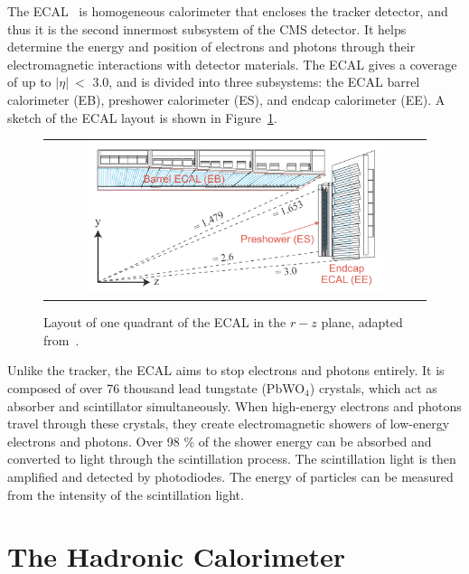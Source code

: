 The \ac{ECAL}~\cite{CMS:1997ysd} is homogeneous calorimeter that encloses the tracker detector, and thus it is the second innermost subsystem of the \ac{CMS} detector. It helps determine the energy and position of electrons and photons through their electromagnetic interactions with detector materials. The \ac{ECAL} gives a coverage of up to $|\eta|~<$ 3.0, and is divided into three subsystems: the \ac{ECAL} barrel calorimeter (EB), preshower calorimeter (ES), and endcap calorimeter (EE). A sketch of the \ac{ECAL} layout is shown in Figure~\ref{fig:ECAL}.

\begin{figure}[tbh!]
 \begin{center}
 \begin{tabular}{c}
 \includegraphics[width=0.8\textwidth]{figures/Part2/CMS/ECAL}
 \end{tabular}
 \caption{Layout of one quadrant of the \ac{ECAL} in the $r-z$ plane, adapted from~\cite{Benaglia:2014aqa}.}
 \label{fig:ECAL}
 \end{center}
\end{figure}

Unlike the tracker, the \ac{ECAL} aims to stop electrons and photons entirely. It is composed of over 76 thousand lead tungstate (PbWO$_{4}$) crystals, which act as absorber and scintillator simultaneously. When high-energy electrons and photons travel through these crystals, they create electromagnetic showers of low-energy electrons and photons. Over 98 \% of the shower energy can be absorbed and converted to light through the scintillation process. The scintillation light is then amplified and detected by photodiodes. The energy of particles can be measured from the intensity of the scintillation light.

\section{The Hadronic Calorimeter}
\label{sec:HCAL}

